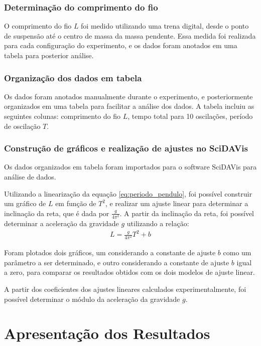 \documentclass[12pt,a4paper]{article}
\begin{document}
\subsubsection{Determinação do comprimento do fio}
O comprimento do fio $L$ foi medido utilizando uma trena digital, desde o ponto de suspensão até o centro de massa da massa pendente. Essa medida foi realizada para cada configuração do experimento, e os dados foram anotados em uma tabela para posterior análise.

\subsubsection{Organização dos dados em tabela}
Os dados foram anotados manualmente durante o experimento, e posteriormente organizados em uma tabela para facilitar a análise dos dados. A tabela incluiu as seguintes colunas: comprimento do fio $L$, tempo total para 10 oscilações, período de oscilação $T$.

\subsubsection{Construção de gráficos e realização de ajustes no SciDAVis}
Os dados organizados em tabela foram importados para o software SciDAVis para análise de dados.

Utilizando a linearização da equação \eqref{eq:periodo_pendulo}, foi possível construir um gráfico de $L$ em função de $T^2$, e realizar um ajuste linear para determinar a inclinação da reta, que é dada por $\frac{g}{4\pi^2}$. A partir da inclinação da reta, foi possível determinar a aceleração da gravidade $g$ utilizando a relação:
\begin{align*}
L = \frac{g}{4\pi^2} T^2 + b
\end{align*}

Foram plotados dois gráficos, um considerando a constante de ajuste $b$ como um parâmetro a ser determinado, e outro considerando a constante de ajuste $b$ igual a zero, para comparar os resultados obtidos com os dois modelos de ajuste linear.

A partir dos coeficientes dos ajustes lineares calculados experimentalmente, 
foi possível determinar o módulo da aceleração da gravidade $g$.

\section{Apresentação dos Resultados}
\end{document}
